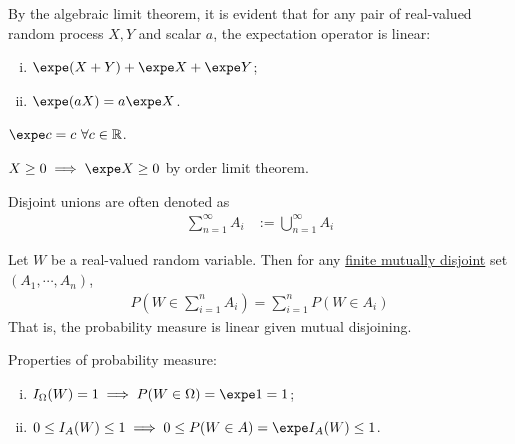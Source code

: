 \documentclass{article}
\begin{document}
   	\begin{theorem}
   		By the algebraic limit theorem, it is evident that for any pair of real-valued random process $X, Y$ and scalar $a$, the expectation operator is linear:
   		\begin{enumerate}[(i)]
   			\item $\expe (X+Y) + \expe X + \expe Y$;
   			\item $\expe (aX) = a \expe X$.
   		\end{enumerate}
   	\end{theorem}
   	
   	\begin{proposition}
   		$\expe c = c\ \forall c \in \R$.
   	\end{proposition}
   	
   	\begin{proposition}
   		$X \geq 0 \implies \expe X \geq 0$ by order limit theorem.
   	\end{proposition}
   	
   	\begin{notation}
   		Disjoint unions are often denoted as
   		\begin{align}
   			\sum_{n=1}^\infty A_i &:= \bigcup_{n=1}^\infty A_i
   		\end{align}
   	\end{notation}
   	
   	\begin{theorem}
   		Let $W$ be a real-valued random variable. Then for any \ul{finite mutually disjoint} set $(A_1, \cdots, A_n)$, 
   		\begin{align}
   			P(W \in \sum_{i=1}^n A_i) = \sum_{i=1}^n P(W \in A_i)
   		\end{align}
   		That is, the probability measure is linear given mutual disjoining.
   	\end{theorem}
   	
   	\begin{proposition}
   		Properties of probability measure:
   		\begin{enumerate}[(i)]
   			\item $I_\Omega(W) = 1 \implies P(W \in \Omega) = \expe 1 = 1$;
   			\item $0 \leq I_A(W) \leq 1 \implies 0 \leq P(W \in A) = \expe I_A(W) \leq 1$.
   		\end{enumerate}
   	\end{proposition}
   	
   	
\end{document}
